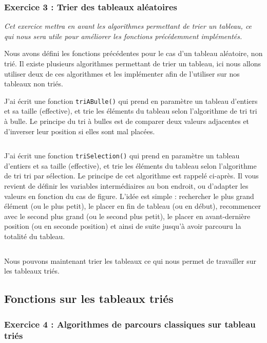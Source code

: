\subsubsection{Exercice 3 : Trier des tableaux aléatoires}
\textit{Cet exercice mettra en avant les algorithmes permettant de trier un tableau, ce qui nous sera utile pour améliorer les fonctions précédemment implémentés.}

Nous avons défini les fonctions précédentes pour le cas d’un tableau aléatoire, non trié.
Il existe plusieurs algorithmes permettant de trier un tableau, ici nous allons utiliser deux de ces algorithmes et les implémenter afin de l'utiliser sur nos tableaux non triés.

J'ai écrit une fonction \texttt{triABulle()} qui prend en paramètre un tableau d’entiers et sa taille (effective), et trie les éléments du tableau selon l’algorithme de tri tri à bulle. Le principe du tri à bulles est de comparer deux valeurs adjacentes et d'inverser leur position si elles sont mal placées.
\inputminted[linenos,firstline=7, lastline=18]{cpp}{../sources/cpp/TP1-2/algosTri.c}

J'ai écrit une fonction \texttt{triSelection()} qui prend en paramètre un tableau d’entiers et sa taille (effective), et trie les éléments du tableau selon l’algorithme de tri tri par sélection. Le principe de cet algorithme est rappelé ci-après. Il vous revient de définir les variables intermédiaires au bon endroit, ou d’adapter les valeurs en fonction du cas de figure.
L'idée est simple : rechercher le plus grand élément (ou le plus petit), le placer en fin de tableau (ou en début), recommencer avec le second plus grand (ou le second plus petit), le placer en avant-dernière position (ou en seconde position) et ainsi de suite jusqu'à avoir parcouru la totalité du tableau.
\inputminted[linenos,firstline=20, lastline=31]{cpp}{../sources/cpp/TP1-2/algosTri.c}

Nous pouvons maintenant trier les tableaux ce qui nous permet de travailler sur les tableaux triés.

\subsection{Fonctions sur les tableaux triés}

\subsubsection{Exercice 4 : Algorithmes de parcours classiques sur tableau triés}

